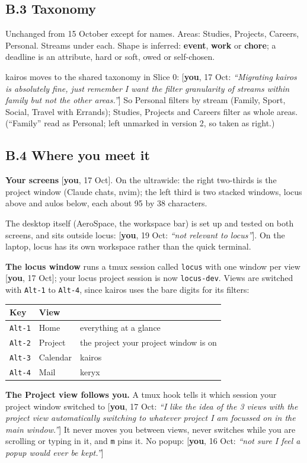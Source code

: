 \documentclass[10pt]{extarticle}
\newcommand{\you}[2]{{\small[\textbf{you}, #1: \textit{``#2''}]}}
\newcommand{\youx}[1]{{\small[\textbf{you}, #1]}}
\newcommand{\Sub}[1]{\subsection*{#1}}
\begin{document}
\Sub{B.3 Taxonomy}
Unchanged from 15 October except for names. Areas: Studies, Projects, Careers, Personal. Streams under each. Shape is inferred: \textbf{event}, \textbf{work} or \textbf{chore}; a deadline is an attribute, hard or soft, owed or self-chosen.

kairos moves to the shared taxonomy in Slice 0: \you{17 Oct}{Migrating kairos is absolutely fine, just remember I want the filter granularity of streams within family but not the other areas.} So Personal filters by stream (Family, Sport, Social, Travel with Errands); Studies, Projects and Careers filter as whole areas. (``Family'' read as Personal; left unmarked in version 2, so taken as right.)

\Sub{B.4 Where you meet it}
\textbf{Your screens} \youx{17 Oct}. On the ultrawide: the right two-thirds is the project window (Claude chats, nvim); the left third is two stacked windows, locus above and aulos below, each about 95 by 38 characters.

The desktop itself (AeroSpace, the workspace bar) is set up and tested on both screens, and sits outside locus: \you{19 Oct}{not relevant to locus}. On the laptop, locus has its own workspace rather than the quick terminal.

\textbf{The locus window} runs a tmux session called \texttt{locus} with one window per view \youx{17 Oct}; your locus project session is now \texttt{locus-dev}. Views are switched with \texttt{Alt-1} to \texttt{Alt-4}, since kairos uses the bare digits for its filters:

\begin{tabularx}{\linewidth}{@{}l l Y@{}}
\toprule
Key & View & \\
\midrule
\texttt{Alt-1} & Home & everything at a glance \\
\texttt{Alt-2} & Project & the project your project window is on \\
\texttt{Alt-3} & Calendar & kairos \\
\texttt{Alt-4} & Mail & keryx \\
\bottomrule
\end{tabularx}

\textbf{The Project view follows you.} A tmux hook tells it which session your project window switched to \you{17 Oct}{I like the idea of the 3 views with the project view automatically switching to whatever project I am focussed on in the main window.} It never moves you between views, never switches while you are scrolling or typing in it, and \texttt{m} pins it. No popup: \you{16 Oct}{not sure I feel a popup would ever be kept.}
\end{document}
